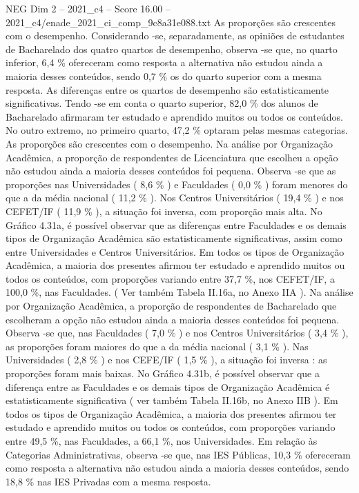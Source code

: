\begin{textsample}{NEG Dim 2 – 2021\_c4 – Score 16.00 – 2021\_c4/enade\_2021\_ci\_comp\_9c8a31e088.txt}
As proporções são crescentes com o desempenho.
Considerando -se, separadamente, as opiniões de estudantes de Bacharelado dos quatro quartos de desempenho, observa -se que, no quarto inferior, 6,4 \% ofereceram como resposta a alternativa não estudou ainda a maioria desses conteúdos, sendo 0,7 \% os do quarto superior com a mesma resposta.
As diferenças entre os quartos de desempenho são estatisticamente significativas.
Tendo -se em conta o quarto superior, 82,0 \% dos alunos de Bacharelado afirmaram ter estudado e aprendido muitos ou todos os conteúdos.
No outro extremo, no primeiro quarto, 47,2 \% optaram pelas mesmas categorias.
As proporções são crescentes com o desempenho.
Na análise por Organização Acadêmica, a proporção de respondentes de Licenciatura que escolheu a opção não estudou ainda a maioria desses conteúdos foi pequena.
Observa -se que as proporções nas Universidades ( 8,6 \% ) e Faculdades ( 0,0 \% ) foram menores do que a da média nacional ( 11,2 \% ).
Nos Centros Universitários ( 19,4 \% ) e nos CEFET/IF ( 11,9 \% ), a situação foi inversa, com proporção mais alta.
No Gráfico 4.31a, é possível observar que as diferenças entre Faculdades e os demais tipos de Organização Acadêmica são estatisticamente significativas, assim como entre Universidades e Centros Universitários.
Em todos os tipos de Organização Acadêmica, a maioria dos presentes afirmou ter estudado e aprendido muitos ou todos os conteúdos, com proporções variando entre 37,7 \%, nos CEFET/IF, a 100,0 \%, nas Faculdades. ( Ver também Tabela II.16a, no Anexo IIA ).
Na análise por Organização Acadêmica, a proporção de respondentes de Bacharelado que escolheram a opção não estudou ainda a maioria desses conteúdos foi pequena.
Observa -se que, nas Faculdades ( 7,0 \% ) e nos Centros Universitários ( 3,4 \% ), as proporções foram maiores do que a da média nacional ( 3,1 \% ).
Nas Universidades ( 2,8 \% ) e nos CEFE/IF ( 1,5 \% ), a situação foi inversa : as proporções foram mais baixas.
No Gráfico 4.31b, é possível observar que a diferença entre as Faculdades e os demais tipos de Organização Acadêmica é estatisticamente significativa ( ver também Tabela II.16b, no Anexo IIB ).
Em todos os tipos de Organização Acadêmica, a maioria dos presentes afirmou ter estudado e aprendido muitos ou todos os conteúdos, com proporções variando entre 49,5 \%, nas Faculdades, a 66,1 \%, nos Universidades.
Em relação às Categorias Administrativas, observa -se que, nas IES Públicas, 10,3 \% ofereceram como resposta a alternativa não estudou ainda a maioria desses conteúdos, sendo 18,8 \% nas IES Privadas com a mesma resposta.

\end{textsample}
